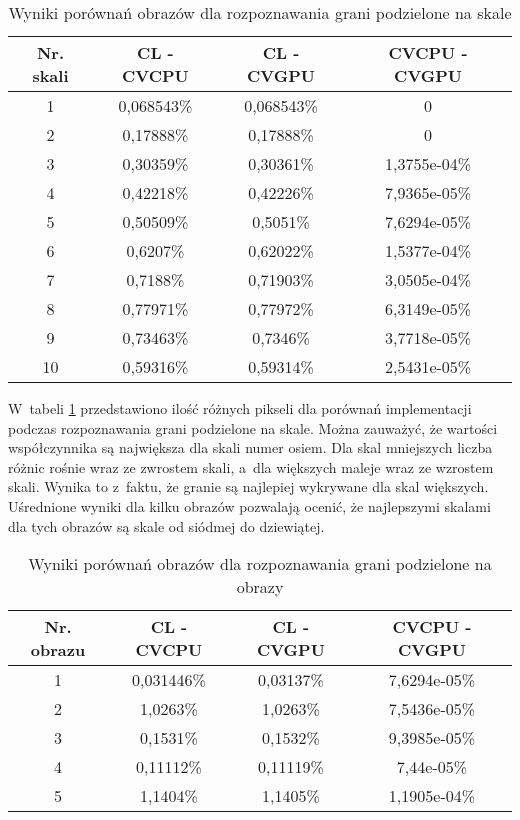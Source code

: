 \begin{center}
\begin{table}
\centering
\caption{Wyniki porównań obrazów dla rozpoznawania grani podzielone na skale}
\label{tab:imageScaleRidge}
\begin{tabular}{|c|c|c|c|}
 \hline
Nr. skali & CL - CVCPU & CL - CVGPU & CVCPU - CVGPU \\ \hline
1 & 0,068543\% & 0,068543\% & 0 \\ \hline
2 & 0,17888\% & 0,17888\% & 0 \\ \hline
3 & 0,30359\% & 0,30361\% & 1,3755e-04\% \\ \hline
4 & 0,42218\% & 0,42226\% & 7,9365e-05\% \\ \hline
5 & 0,50509\% & 0,5051\% & 7,6294e-05\% \\ \hline
6 & 0,6207\% & 0,62022\% & 1,5377e-04\% \\ \hline
7 & 0,7188\% & 0,71903\% & 3,0505e-04\% \\ \hline
8 & 0,77971\% & 0,77972\% & 6,3149e-05\% \\ \hline
9 & 0,73463\% & 0,7346\% & 3,7718e-05\% \\ \hline
10 & 0,59316\% & 0,59314\% & 2,5431e-05\% \\ \hline
\end{tabular}
\end{table}
\end{center}

W~tabeli \ref{tab:imageScaleRidge} przedstawiono ilość różnych pikseli dla porównań implementacji podczas rozpoznawania grani podzielone na skale. Można zauważyć, że wartości współczynnika są największa dla skali numer osiem. Dla skal mniejszych liczba różnic rośnie wraz ze zwrostem skali, a~dla większych maleje wraz ze wzrostem skali. Wynika to z~faktu, że granie są najlepiej wykrywane dla skal większych. Uśrednione wyniki dla kilku obrazów pozwalają ocenić, że najlepszymi skalami dla tych obrazów są skale od siódmej do dziewiątej.

\begin{center}
\begin{table}
\centering
\caption{Wyniki porównań obrazów dla rozpoznawania grani podzielone na obrazy}
\label{tab:imageImageRidge}
\begin{tabular}{|c|c|c|c|}
\hline
Nr. obrazu & CL - CVCPU & CL - CVGPU & CVCPU - CVGPU \\ \hline
1 & 0,031446\% & 0,03137\% & 7,6294e-05\% \\ \hline
2 & 1,0263\% & 1,0263\% & 7,5436e-05\% \\ \hline
3 & 0,1531\% & 0,1532\% & 9,3985e-05\% \\ \hline
4 & 0,11112\% & 0,11119\% & 7,44e-05\% \\ \hline
5 & 1,1404\% & 1,1405\% & 1,1905e-04\% \\ \hline
\end{tabular}
\end{table}
\end{center}

